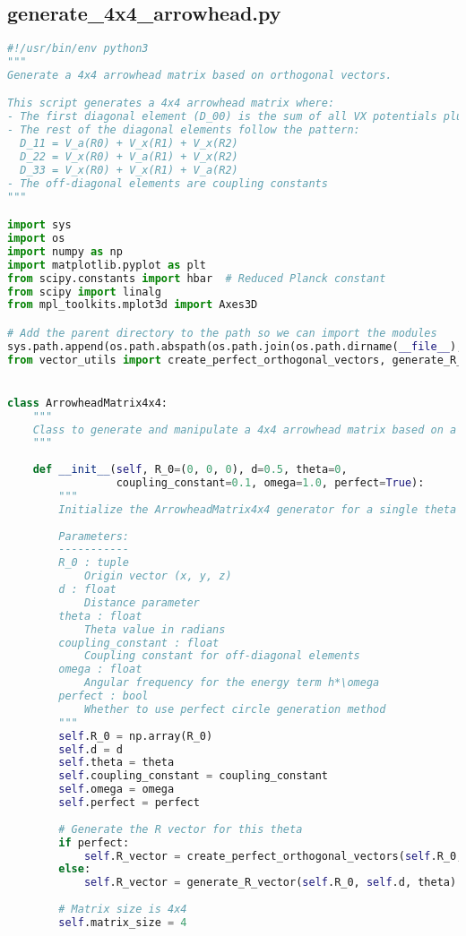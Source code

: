 \subsection{generate\_4x4\_arrowhead.py}

\begin{lstlisting}[language=Python]
#!/usr/bin/env python3
"""
Generate a 4x4 arrowhead matrix based on orthogonal vectors.

This script generates a 4x4 arrowhead matrix where:
- The first diagonal element (D_00) is the sum of all VX potentials plus h*\omega
- The rest of the diagonal elements follow the pattern:
  D_11 = V_a(R0) + V_x(R1) + V_x(R2)
  D_22 = V_x(R0) + V_a(R1) + V_x(R2)
  D_33 = V_x(R0) + V_x(R1) + V_a(R2)
- The off-diagonal elements are coupling constants
"""

import sys
import os
import numpy as np
import matplotlib.pyplot as plt
from scipy.constants import hbar  # Reduced Planck constant
from scipy import linalg
from mpl_toolkits.mplot3d import Axes3D

# Add the parent directory to the path so we can import the modules
sys.path.append(os.path.abspath(os.path.join(os.path.dirname(__file__), '../..')))
from vector_utils import create_perfect_orthogonal_vectors, generate_R_vector


class ArrowheadMatrix4x4:
    """
    Class to generate and manipulate a 4x4 arrowhead matrix based on a single orthogonal vector.
    """
    
    def __init__(self, R_0=(0, 0, 0), d=0.5, theta=0, 
                 coupling_constant=0.1, omega=1.0, perfect=True):
        """
        Initialize the ArrowheadMatrix4x4 generator for a single theta value.
        
        Parameters:
        -----------
        R_0 : tuple
            Origin vector (x, y, z)
        d : float
            Distance parameter
        theta : float
            Theta value in radians
        coupling_constant : float
            Coupling constant for off-diagonal elements
        omega : float
            Angular frequency for the energy term h*\omega
        perfect : bool
            Whether to use perfect circle generation method
        """
        self.R_0 = np.array(R_0)
        self.d = d
        self.theta = theta
        self.coupling_constant = coupling_constant
        self.omega = omega
        self.perfect = perfect
        
        # Generate the R vector for this theta
        if perfect:
            self.R_vector = create_perfect_orthogonal_vectors(self.R_0, self.d, theta)
        else:
            self.R_vector = generate_R_vector(self.R_0, self.d, theta)
        
        # Matrix size is 4x4
        self.matrix_size = 4
\end{lstlisting}

